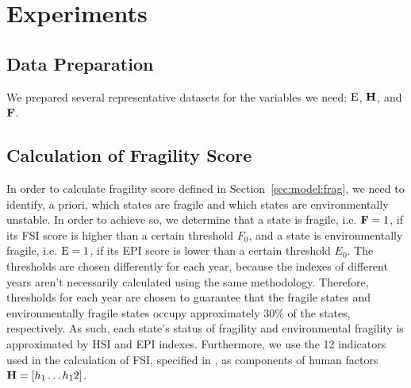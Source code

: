 \section{Experiments}
\label{sec:exp}
\subsection{Data Preparation}
\label{sec:exp:prep}


We prepared several representative datasets for the variables we need: $\operatorname*{E}$, $\operatorname*{\mathbf{H}}$, and $\operatorname*{\mathbf{F}}$.



\subsection{Calculation of Fragility Score}
In order to calculate fragility score defined in Section~\ref{sec:model:frag}, we need to identify, a priori, which states are fragile and which states are environmentally unstable. 
In order to achieve so, we determine that a state is fragile, i.e. $\operatorname*{\mathbf{F}}=1$, if its FSI score is higher than a certain threshold $F_0$, and a state is environmentally fragile, i.e. $\operatorname*{E}=1$, if its EPI score is lower than a certain threshold $E_0$. 
The thresholds are chosen differently for each year, because the indexes of different years aren't necessarily calculated using the same methodology.
Therefore, thresholds for each year are chosen to guarantee that the fragile states and environmentally fragile states occupy approximately $30\%$ of the states, respectively. As such, each state's status of fragility and environmental fragility is approximated by HSI and EPI indexes. Furthermore, we use the 12 indicators used in the calculation of FSI, specified in , as components of human factors $\operatorname*{\mathbf{H}} = \left[ h_1\ldots h_12 \right]$.

